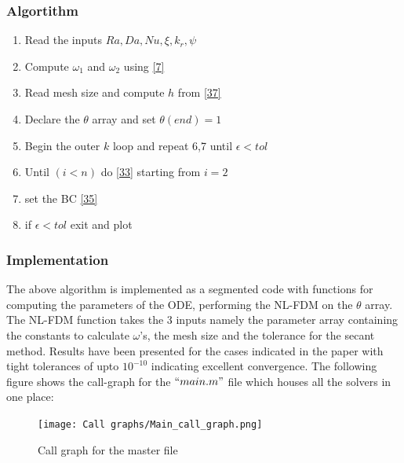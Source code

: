 \documentclass[12pt]{article}
\begin{document}
\subsubsection{Algortithm}
\begin{enumerate}
    \item Read the inputs $Ra, Da, Nu, \xi, k_r, \psi$
    \item Compute $\omega_1$ and $\omega_2$ using \eqref{7}
    \item Read mesh size and compute $h$ from \eqref{37}
    \item Declare the $\theta$ array and set $\theta(end)=1$
    \item Begin the outer $k$ loop and repeat 6,7 until $\epsilon<tol$
    \item Until $(i<n)$ do \eqref{33} starting from $i=2$
    \item set the BC \eqref{35}
    \item if $\epsilon<tol$ exit and plot
\end{enumerate}
\subsubsection{Implementation}
The above algorithm is implemented as a segmented code with functions for computing the parameters of the ODE, performing the NL-FDM on the $\theta$ array. The NL-FDM function takes the 3 inputs namely the parameter array containing the constants to calculate $\omega$'s, the mesh size and the tolerance for the secant method. Results have been presented for the cases indicated in the paper with tight tolerances of upto $10^{-10}$ indicating excellent convergence. The following figure shows the call-graph for the $``main.m"$ file which houses all the solvers in one place:
\begin{figure}[H]
    \centering
    \texttt{[image: Call graphs/Main\_call\_graph.png]}
    \caption{Call graph for the master file}
    \label{fig:11}
\end{figure}
\end{document}
